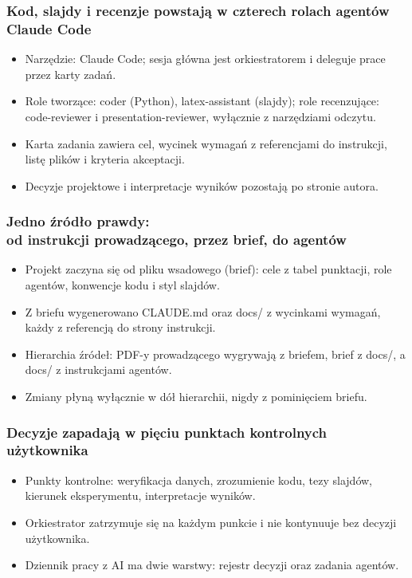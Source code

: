 
\begin{frame}
  \frametitle{Kod, slajdy i recenzje powstają w czterech rolach agentów Claude Code}
  \begin{itemize}
    \item Narzędzie: Claude Code; sesja główna jest orkiestratorem i deleguje
      prace przez karty zadań.
    \item Role tworzące: coder (Python), latex-assistant (slajdy); role
      recenzujące: code-reviewer i presentation-reviewer, wyłącznie
      z narzędziami odczytu.
    \item Karta zadania zawiera cel, wycinek wymagań z referencjami do
      instrukcji, listę plików i kryteria akceptacji.
    \item Decyzje projektowe i interpretacje wyników pozostają po stronie
      autora.
  \end{itemize}
\end{frame}

\begin{frame}
  \frametitle{Jedno źródło prawdy:\\
    od instrukcji prowadzącego, przez brief, do agentów}
  \begin{itemize}
    \item Projekt zaczyna się od pliku wsadowego (brief): cele z tabel
      punktacji, role agentów, konwencje kodu i styl slajdów.
    \item Z briefu wygenerowano CLAUDE.md oraz docs/ z wycinkami wymagań,
      każdy z referencją do strony instrukcji.
    \item Hierarchia źródeł: PDF-y prowadzącego wygrywają z briefem, brief
      z docs/, a docs/ z instrukcjami agentów.
    \item Zmiany płyną wyłącznie w dół hierarchii, nigdy z pominięciem
      briefu.
  \end{itemize}
\end{frame}

\begin{frame}
  \frametitle{Decyzje zapadają w pięciu punktach kontrolnych użytkownika}
  \begin{itemize}
    \item Punkty kontrolne: weryfikacja danych, zrozumienie kodu, tezy
      slajdów, kierunek eksperymentu, interpretacje wyników.
    \item Orkiestrator zatrzymuje się na każdym punkcie i nie kontynuuje
      bez decyzji użytkownika.
    \item Dziennik pracy z AI ma dwie warstwy: rejestr decyzji oraz zadania
      agentów.
  \end{itemize}
\end{frame}
